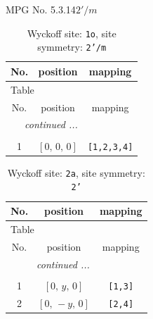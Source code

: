 \documentclass[fleqn,8pt]{jsarticle}
\begin{document}
\setcounter{MaxMatrixCols}{32}

\renewcommand{\tablename}{Table~}
\renewcommand{\figurename}{Figure~}
\begin{center}
\LARGE
MPG No. 5.3.14\quad$2'/m$
\end{center}
\renewcommand{\arraystretch}{1.2}
\begin{longtable}{ccc}
\caption{Wyckoff site: {\tt 1o}, site symmetry: {\tt 2'/m}}
 \\
 \hline \hline
No. & position & mapping \\ \hline \endfirsthead

\multicolumn{2}{l}{\tablename\ \thetable{}} \\
 \hline \hline
No. & position & mapping \\ \hline \endhead

 \hline \hline
\multicolumn{2}{r}{\footnotesize\it continued ...} \\ \endfoot

 \hline \hline
\multicolumn{2}{r}{} \\ \endlastfoot

1 & $\left[ 0,\, 0,\, 0 \right]$ & {\tt [1,2,3,4]} \\
\end{longtable}
\renewcommand{\arraystretch}{1.2}
\begin{longtable}{ccc}
\caption{Wyckoff site: {\tt 2a}, site symmetry: {\tt 2'}}
 \\
 \hline \hline
No. & position & mapping \\ \hline \endfirsthead

\multicolumn{2}{l}{\tablename\ \thetable{}} \\
 \hline \hline
No. & position & mapping \\ \hline \endhead

 \hline \hline
\multicolumn{2}{r}{\footnotesize\it continued ...} \\ \endfoot

 \hline \hline
\multicolumn{2}{r}{} \\ \endlastfoot

1 & $\left[ 0,\, y,\, 0 \right]$ & {\tt [1,3]} \\ \hline
2 & $\left[ 0,\, - y,\, 0 \right]$ & {\tt [2,4]} \\
\end{longtable}
\renewcommand{\arraystretch}{1.2}
\end{document}
